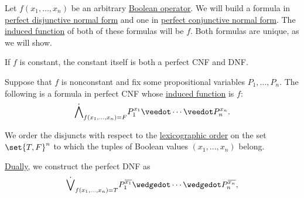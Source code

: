 \begin{algorithm}\label{alg:perfect_cnf_and_dnf}
  Let \( f(x_1, \ldots, x_n) \) be an arbitrary \hyperref[def:boolean_operator]{Boolean operator}. We will build a formula in \hyperref[def:cnf_and_dnf/perfect]{perfect disjunctive normal form} and one in \hyperref[def:cnf_and_dnf/perfect]{perfect conjunctive normal form}. The \hyperref[def:propositional_valuation/valuation_function]{induced function} of both of these formulas will be \( f \). Both formulas are unique, as we will show.

  \begin{thmenum}
     If \( f \) is constant, the constant itself is both a perfect CNF and DNF.

     Suppose that \( f \) is nonconstant and fix some propositional variables \( P_1, \ldots, P_n \). The following is a formula in perfect CNF whose \hyperref[def:propositional_valuation/valuation_function]{induced function} is \( f \):
    \begin{equation}\label{alg:perfect_cnf_and_dnf/cnf}
      \dot\bigwedge_{f(x_1, \ldots, x_n) = F} P_1^{x_1} \synvee \cdots \synvee P_n^{x_n}.
    \end{equation}

    We order the disjuncts with respect to the \hyperref[def:lexicographic_order]{lexicographic order} on the set \( \set{ T, F }^n \) to which the tuples of Boolean values \( (x_1, \ldots, x_n) \) belong.

    \hyperref[thm:lattice_duality]{Dually}, we construct the perfect DNF as
    \begin{equation}\label{alg:perfect_cnf_and_dnf/dnf}
      \dot\bigvee_{f(x_1, \ldots, x_n) = T} P_1^{\overline{x_1}} \synwedge \cdots \synwedge P_n^{\overline{x_n}},
    \end{equation}
  \end{thmenum}
\end{algorithm}
